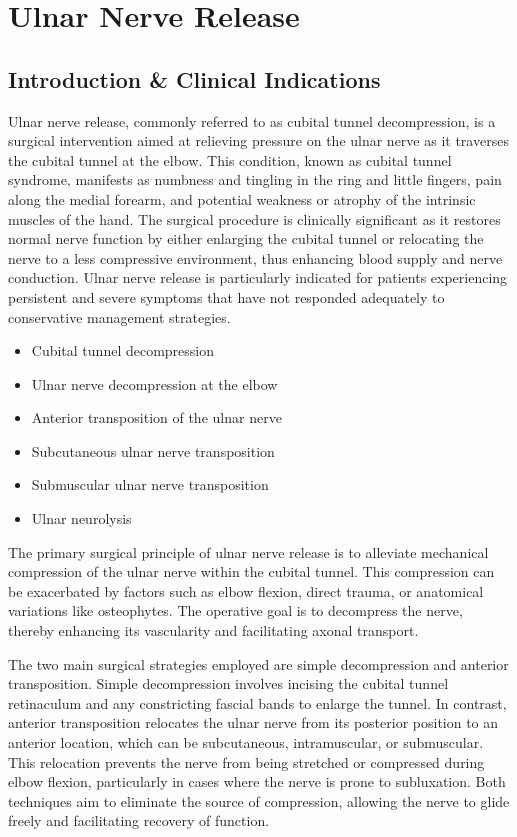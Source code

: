 \chapter{Ulnar Nerve Release}

\section*{Introduction \& Clinical Indications}
Ulnar nerve release, commonly referred to as cubital tunnel decompression, is a surgical intervention aimed at relieving pressure on the ulnar nerve as it traverses the cubital tunnel at the elbow. This condition, known as cubital tunnel syndrome, manifests as numbness and tingling in the ring and little fingers, pain along the medial forearm, and potential weakness or atrophy of the intrinsic muscles of the hand. The surgical procedure is clinically significant as it restores normal nerve function by either enlarging the cubital tunnel or relocating the nerve to a less compressive environment, thus enhancing blood supply and nerve conduction. Ulnar nerve release is particularly indicated for patients experiencing persistent and severe symptoms that have not responded adequately to conservative management strategies.

\begin{itemize}
  \item Cubital tunnel decompression
  \item Ulnar nerve decompression at the elbow
  \item Anterior transposition of the ulnar nerve
  \item Subcutaneous ulnar nerve transposition
  \item Submuscular ulnar nerve transposition
  \item Ulnar neurolysis
\end{itemize}

The primary surgical principle of ulnar nerve release is to alleviate mechanical compression of the ulnar nerve within the cubital tunnel. This compression can be exacerbated by factors such as elbow flexion, direct trauma, or anatomical variations like osteophytes. The operative goal is to decompress the nerve, thereby enhancing its vascularity and facilitating axonal transport.

The two main surgical strategies employed are simple decompression and anterior transposition. Simple decompression involves incising the cubital tunnel retinaculum and any constricting fascial bands to enlarge the tunnel. In contrast, anterior transposition relocates the ulnar nerve from its posterior position to an anterior location, which can be subcutaneous, intramuscular, or submuscular. This relocation prevents the nerve from being stretched or compressed during elbow flexion, particularly in cases where the nerve is prone to subluxation. Both techniques aim to eliminate the source of compression, allowing the nerve to glide freely and facilitating recovery of function.


